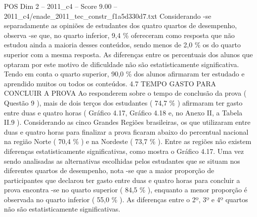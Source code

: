 \begin{textsample}{POS Dim 2 – 2011\_c4 – Score 9.00 – 2011\_c4/enade\_2011\_tec\_constr\_f1a5d330d7.txt}
Considerando -se separadamente as opiniões de estudantes dos quatro quartos de desempenho, observa -se que, no quarto inferior, 9,4 \% ofereceram como resposta que não estudou ainda a maioria desses conteúdos, sendo menos de 2,0 \% os do quarto superior com a mesma resposta.
As diferenças entre os percentuais dos alunos que optaram por este motivo de dificuldade não são estatisticamente significativa.
Tendo em conta o quarto superior, 90,0 \% dos alunos afirmaram ter estudado e aprendido muitos ou todos os conteúdos. 4.7 TEMPO GASTO PARA CONCLUIR A PROVA Ao responderem sobre o tempo de conclusão da prova ( Questão 9 ), mais de dois terços dos estudantes ( 74,7 \% ) afirmaram ter gasto entre duas e quatro horas ( Gráfico 4.17, Gráfico 4.18 e, no Anexo II, a Tabela II.9 ).
Considerando as cinco Grandes Regiões brasileiras, os que utilizaram entre duas e quatro horas para finalizar a prova ficaram abaixo do percentual nacional na região Norte ( 70,4 \% ) e na Nordeste ( 73,7 \% ).
Entre as regiões não existem diferenças estatisticamente significativas, como mostra o Gráfico 4.17.
Uma vez sendo analisadas as alternativas escolhidas pelos estudantes que se situam nos diferentes quartos de desempenho, nota -se que a maior proporção de participantes que declarou ter gasto entre duas e quatro horas para concluir a prova encontra -se no quarto superior ( 84,5 \% ), enquanto a menor proporção é observada no quarto inferior ( 55,0 \% ).
As diferenças entre o 2º, 3º e 4º quartos não são estatisticamente significativas.

\end{textsample}
